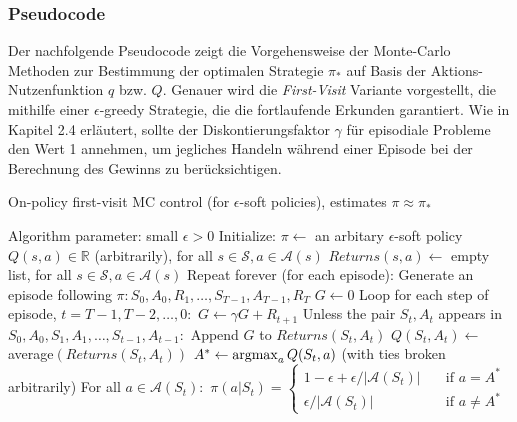 \subsubsection{Pseudocode}
Der nachfolgende Pseudocode \cite[S.~101]{Sutton1998} zeigt die Vorgehensweise der Monte-Carlo Methoden zur Bestimmung der optimalen Strategie $\pi_*$ auf Basis der Aktions-Nutzenfunktion $q$ bzw. $Q$. Genauer wird die \textit{First-Visit} Variante vorgestellt, die mithilfe einer $\epsilon$-greedy Strategie, die die fortlaufende Erkunden garantiert. Wie in Kapitel 2.4 erläutert, sollte der Diskontierungsfaktor $\gamma$ für episodiale Probleme den Wert 1 annehmen, um jegliches Handeln während einer Episode bei der Berechnung des Gewinns zu berücksichtigen.
\par 
\begin{algorithm}
    \caption{On-policy first-visit MC control (for $\epsilon$-soft policies), estimates $\pi \approx \pi_*$}
    \begin{algorithmic}[1]
        \State Algorithm parameter: small $\epsilon > 0$
        \State Initialize:
        \Indent
           \State $\pi \gets$ an arbitary $\epsilon$-soft policy
           \State $Q(s,a) \in \mathbb{R}$ (arbitrarily), for all $s \in \mathcal{S}, a \in \mathcal{A}(s)$
           \State $Returns(s,a) \gets$ empty list, for all $s \in \mathcal{S}, a \in \mathcal{A}(s)$
        \EndIndent
        \State Repeat forever (for each episode):
        \Indent
            \State Generate an episode following $\pi: S_0, A_0, R_1, \dots, S_{T-1}, A_{T-1}, R_T$
            \State $G \gets 0$
            \State Loop for each step of episode, $t= T-1,T-2, \dots, 0:$
            \Indent
                \State $G \gets \gamma G + R_{t+1}$
                \State Unless the pair $S_t, A_t$ appears in $S_0, A_0, S_1, A_1, \dots ,S_{t-1}, A_{t-1}:$
                \Indent
                    \State Append $G$ to $Returns(S_t,A_t)$
                    \State $Q(S_t,A_t) \gets$ average$(Returns(S_t,A_t))$
                    \State $A^* \gets \operatorname*{argmax}_a Q(S_t, a)$ (with ties broken arbitrarily)
                    \State For all $a \in \mathcal{A}(S_t):$
                    \Indent
                     \State  $\pi(a|S_t) =   
                        \begin{cases}
                            1-\epsilon + \epsilon / |\mathcal{A}(S_t)|      & \quad \text{if } a = A^* \\
                            \epsilon / |\mathcal{A}(S_t)|  & \quad \text{if } a \neq A^*
                        \end{cases}$
                    \EndIndent
                \EndIndent
            \EndIndent
        \EndIndent 
    \end{algorithmic}
\end{algorithm}
